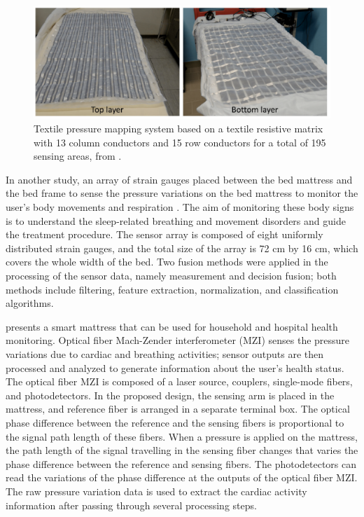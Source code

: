 \begin{figure}
    \centering
    \includegraphics[scale=1]{Figure/Seating and Mobility Aids/Smart_bed.PNG}
    \caption{Textile pressure mapping system based on a textile resistive matrix with 13 column conductors and 15 row conductors for a total of 195 sensing areas, from \parencite{laurino_smart_2020}.}
    \label{fig:smart_bed}
\end{figure}

In another study, an array of strain gauges placed between the bed mattress and the bed frame to sense the pressure variations on the bed mattress to monitor the user's body movements and respiration \parencite{waltisberg_detecting_2017}. The aim of monitoring these body signs is to understand the sleep-related breathing and movement disorders and guide the treatment procedure. The sensor array is composed of eight uniformly distributed strain gauges, and the total size of the array is 72 cm by 16 cm, which covers the whole width of the bed. Two fusion methods were applied in the processing of the sensor data, namely measurement and decision fusion; both methods include filtering, feature extraction, normalization, and classification algorithms. 

\textcite{wang_noninvasive_2020} presents a smart mattress that can be used for household and hospital health monitoring. Optical fiber Mach-Zender interferometer (MZI) senses the pressure variations due to cardiac and breathing activities; sensor outputs are then processed and analyzed to generate information about the user's health status. The optical fiber MZI is composed of a laser source, couplers, single-mode fibers, and photodetectors. In the proposed design, the sensing arm is placed in the mattress, and reference fiber is arranged in a separate terminal box. The optical phase difference between the reference and the sensing fibers is proportional to the signal path length of these fibers. When a pressure is applied on the mattress, the path length of the signal travelling in the sensing fiber changes that varies the phase difference between the reference and sensing fibers. The photodetectors can read the variations of the phase difference at the outputs of the optical fiber MZI. The raw pressure variation data is used to extract the cardiac activity information after passing through several processing steps. 

